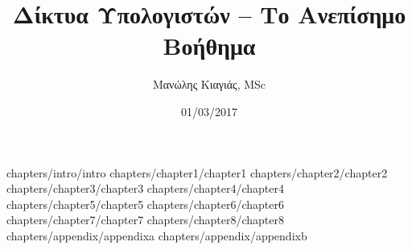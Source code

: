 \documentclass[a4paper,twoside,12pt]{book}
\author{Μανώλης Κιαγιάς, MSc}
\title{Δίκτυα Υπολογιστών -- Το Ανεπίσημο Βοήθημα}
\date{01/03/2017}
\begin{document}
\frontmatter
 {chapters/intro/intro}
\mainmatter
 {chapters/chapter1/chapter1}
 {chapters/chapter2/chapter2}
 {chapters/chapter3/chapter3}
 {chapters/chapter4/chapter4}
 {chapters/chapter5/chapter5}
 {chapters/chapter6/chapter6}
 {chapters/chapter7/chapter7}
 {chapters/chapter8/chapter8}
\appendix
 {chapters/appendix/appendixa}
 {chapters/appendix/appendixb}
\end{document}
